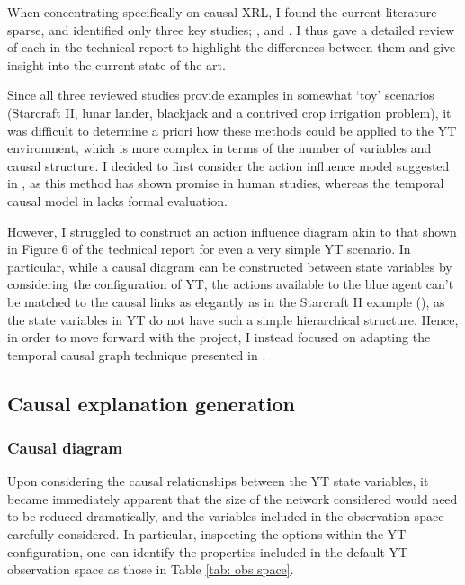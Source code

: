 \documentclass{article}
\begin{document}
When concentrating specifically on causal XRL, I found the current literature sparse, and identified only three key studies; \cite{madumal2020explainable}, \cite{wang2022causal} and \cite{madumal2020distal}. I thus gave a detailed review of each in the technical report to highlight the differences between them and give insight into the current state of the art. 

Since all three reviewed studies provide examples in somewhat `toy' scenarios (Starcraft II, lunar lander, blackjack and a contrived crop irrigation problem), it was difficult to determine a priori how these methods could be applied to the YT environment, which is more complex in terms of the number of variables and causal structure. I decided to first consider the action influence model suggested in \cite{madumal2020explainable}, as this method has shown promise in human studies, whereas the temporal causal model in \cite{wang2022causal} lacks formal evaluation. 

However, I struggled to construct an action influence diagram akin to that shown in Figure 6 of the technical report for even a very simple YT scenario. In particular, while a causal diagram can be constructed between state variables by considering the configuration of YT, the actions available to the blue agent can't be matched to the causal links as elegantly as in the Starcraft II example (\cite{madumal2020explainable}), as the state variables in YT do not have such a simple hierarchical structure. Hence, in order to move forward with the project, I instead focused on adapting the temporal causal graph technique presented in \cite{wang2022causal}. 


\subsection{Causal explanation generation}

\subsubsection{Causal diagram}

Upon considering the causal relationships between the YT state variables, it became immediately apparent that the size of the network considered would need to be reduced dramatically, and the variables included in the observation space carefully considered. In particular, inspecting the options within the YT configuration, one can identify the properties included in the default YT observation space as those in Table \ref{tab: obs space}.
\end{document}
